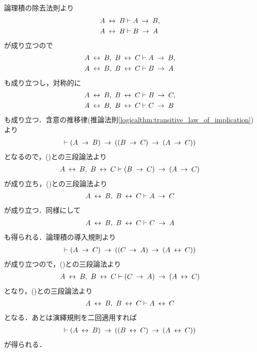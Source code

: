 	\begin{sketch}
		論理積の除去法則より
		\begin{align}
			A \lrarrow B &\vdash A \rarrow B, \\
			A \lrarrow B &\vdash B \rarrow A
		\end{align}
		が成り立つので
		\begin{align}
			A \lrarrow B,\ B \lrarrow C &\vdash A \rarrow B, 
			\label{fom:transitive_law_of_equivalence_symbol_1} \\
			A \lrarrow B,\ B \lrarrow C &\vdash B \rarrow A
		\end{align}
		も成り立つし，対称的に
		\begin{align}
			A \lrarrow B,\ B \lrarrow C &\vdash B \rarrow C, 
			\label{fom:transitive_law_of_equivalence_symbol_2} \\
			A \lrarrow B,\ B \lrarrow C &\vdash C \rarrow B
		\end{align}
		も成り立つ．含意の推移律(推論法則\ref{logicalthm:transitive_law_of_implication})より
		\begin{align}
			\vdash (A \rarrow B) \rarrow ((B \rarrow C) \rarrow (A \rarrow C))
		\end{align}
		となるので，()との三段論法より
		\begin{align}
			A \lrarrow B,\ B \lrarrow C \vdash (B \rarrow C) \rarrow (A \rarrow C)
		\end{align}
		が成り立ち，()との三段論法より
		\begin{align}
			A \lrarrow B,\ B \lrarrow C \vdash A \rarrow C
			\label{fom:transitive_law_of_equivalence_symbol_3}
		\end{align}
		が成り立つ．同様にして
		\begin{align}
			A \lrarrow B,\ B \lrarrow C \vdash C \rarrow A
			\label{fom:transitive_law_of_equivalence_symbol_4}
		\end{align}
		も得られる．論理積の導入規則より
		\begin{align}
			\vdash (A \rarrow C) \rarrow ((C \rarrow A) \rarrow (A \lrarrow C))
		\end{align}
		が成り立つので，()との三段論法より
		\begin{align}
			A \lrarrow B,\ B \lrarrow C \vdash (C \rarrow A) \rarrow (A \lrarrow C)
		\end{align}
		となり，()との三段論法より
		\begin{align}
			A \lrarrow B,\ B \lrarrow C \vdash A \lrarrow C
		\end{align}
		となる．あとは演繹規則を二回適用すれば
		\begin{align}
			\vdash (A \lrarrow B) \rarrow ((B \lrarrow C) \rarrow (A \lrarrow C))
		\end{align}
		が得られる．
		\QED
	\end{sketch}
	
